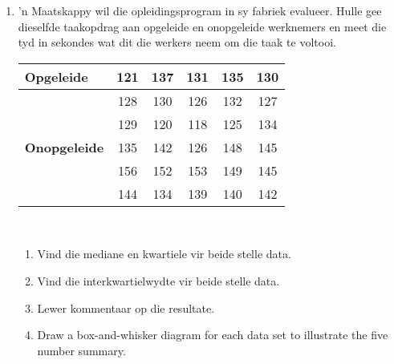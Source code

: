 \begin{eocexercises}{}
\begin{enumerate}[itemsep=6pt, label=\textbf{\arabic*}.]
  \item ’n Maatskappy wil die opleidingsprogram in sy fabriek evalueer. Hulle gee dieselfde taakopdrag aan opgeleide en onopgeleide werknemers en meet die tyd in sekondes wat  dit die werkers neem om die taak te voltooi. 
\\
    \begin{center}
      \begin{tabular}{|l|c|c|c|c|c|} \hline

        \textbf{Opgeleide} & 121 & 137 & 131 & 135 & 130 \\ \hline
                         & 128 & 130 & 126 & 132 & 127 \\\hline
                         & 129 & 120 & 118 & 125 & 134 \\\hline

        \textbf{Onopgeleide} & 135 & 142 & 126 & 148 & 145 \\\hline
                           & 156 & 152 & 153 & 149 & 145 \\\hline
                           & 144 & 134 & 139 & 140 & 142 \\\hline

      \end{tabular}
    \end{center}
\vspace {8pt}\\
    \begin{enumerate}[noitemsep, label=\textbf{(\alph*)} ]
    \item Vind die mediane en kwartiele vir beide stelle data.
    \item Vind die interkwartielwydte vir beide stelle data.
    \item Lewer kommentaar op die resultate.
    \item Draw a box-and-whisker diagram for each data set to illustrate the five number summary.
    \end{enumerate}


\end{enumerate}
\end{eocexercises}
